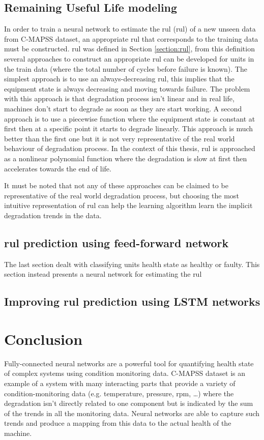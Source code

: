 \subsection{Remaining Useful Life modeling}
In order to train a neural network to estimate the \acrlong{rul} (\acrshort{rul}) of a new unseen data from C-MAPSS dataset, an appropriate \acrshort{rul} that corresponds to the training data must be constructed. \acrshort{rul} was defined in Section \ref{section:rul}, from this definition several approaches to construct an appropriate \acrshort{rul} can be developed for units in the train data (where the total number of cycles before failure is known). The simplest approach is to use an always-decreasing \acrshort{rul}, this implies that the equipment state is always decreasing and moving towards failure. The problem with this approach is that degradation process isn't linear and in real life, machines don't start to degrade as soon as they are start working. A second approach is to use a piecewise function where the equipment state is constant at first then at a specific point it starts to degrade linearly. This approach is much better than the first one but it is not very representative of the real world behaviour of degradation process. In the context of this thesis, \acrshort{rul} is approached as a nonlinear polynomial function where the degradation is slow at first then accelerates towards the end of life.

It must be noted that not any of these approaches can be claimed to be representative of the real world degradation process, but choosing the most intuitive representation of \acrshort{rul} can help the learning algorithm learn the implicit degradation trends in the data.

\subsection{\acrshort{rul} prediction using feed-forward network}
The last section dealt with classifying units health state as healthy or faulty. This section instead presents a neural network for estimating the \acrshort{rul}

\subsection{Improving \acrshort{rul} prediction using LSTM networks}

\section{Conclusion}
Fully-connected neural networks are a powerful tool for quantifying health state of complex systems using condition monitoring data. C-MAPSS dataset is an example of a system with many interacting parts that provide a variety of condition-monitoring data (e.g. temperature, pressure, rpm, …) where the degradation isn't directly related to one component but is indicated by the sum of the trends in all the monitoring data. Neural networks are able to capture such trends and produce a mapping from this data to the actual health of the machine.